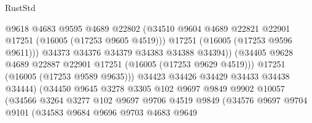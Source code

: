 \begin{lexlean}{RustStd}
\begin{coremodule}
                                      @9618
                                      @4683
                                      @9595
                                      @4689
                                      @22802
                                      (@34510
                                        @9604
                                        @4689
                                        @22821
                                        @22901
                                        @17251
                                        (@16005 (@17253 @9605 @4519)))
                                      @17251
                                      (@16005 (@17253 @9596 @9611)))
                                    @34373
                                    @34376
                                    @34379
                                    @34383
                                    @34388
                                    @34394))
                                (@34405
                                  @9628
                                  @4689
                                  @22887
                                  @22901
                                  @17251
                                  (@16005 (@17253 @9629 @4519)))
                                @17251
                                (@16005 (@17253 @9589 @9635)))
                              @34423
                              @34426
                              @34429
                              @34433
                              @34438
                              @34444)
                            (@34450
                              @9645
                              @3278
                              @3305
                              @102
                              @9697
                              @9849
                              @9902
                              @10057
                              (@34566
                                @3264
                                @3277
                                @102
                                @9697
                                @9706
                                @4519
                                @9849
                                (@34576
                                  @9697
                                  @9704
                                  @9101
                                  (@34583
                                    @9684
                                    @9696
                                    @9703
                                    @4683
                                    @9649

\end{coremodule}
\end{lexlean}
